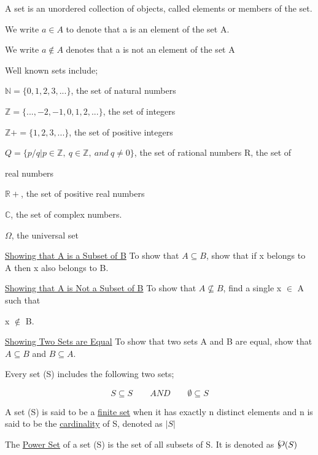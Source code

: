\documentclass[12pt]{article}
\newcommand{\N}{\mathbb{N}}
\newcommand{\Z}{\mathbb{Z}}
\newcommand{\C}{\mathbb{C}}
\newcommand{\R}{\mathbb{R}}
\newcommand{\powerset}{\raisebox{.15\baselineskip}{\Large\ensuremath{\wp}}}
\begin{document}
\quad

\noindent A set is an unordered collection of objects, called elements or members of the set. 

We write $a \in A$ to denote that a is an element of the set A. 

We write $a \notin A$ denotes that a is not an element of the set A

\quad

\noindent Well known sets include;

$\N=\{ 0, 1, 2, 3, . . . \}$, the set of natural numbers

$\Z = \{ . . . , -2, -1 ,0 ,1 ,2 , . . . \}$, the set of integers

$\Z += \{1, 2, 3, . . . \}$, the set of positive integers

$Q = \{p/q | p \in \Z,\ q \in \Z,\ and\ q \neq  0\}$, the set of rational numbers R, the set of 

\indent \indent real numbers

$\R+$, the set of positive real numbers

$\C$, the set of complex numbers.

$\Omega$, the universal set

\quad

\noindent \underline{Showing that A is a Subset of B} To show that $A \subseteq B$, show that if x belongs to A then x 
\indent also belongs to B.

\quad

\noindent \underline{Showing that A is Not a Subset of B} To show that $A \nsubseteq B$, find a single x $\in$ A such that  

\indent x $\notin$ B.

\quad

\noindent \underline{Showing Two Sets are Equal} To show that two sets A and B are equal, show that $A \subseteq B$ and $B \subseteq A$.

\quad

\noindent Every set (S) includes the following two sets;

\[
	S \subseteq S \quad \quad AND \quad \quad \emptyset \subseteq S
\]

\quad

\noindent A set (S) is said to be a \underline{finite set} when it has exactly n distinct elements and n is said to be \indent the \underline{cardinality} of S, denoted as $|S|$

\quad

\noindent The \underline{Power Set} of a set (S) is the set of all subsets of S. It is denoted as $\powerset (S)$
\end{document}
